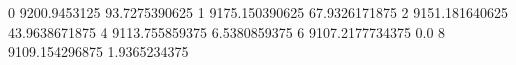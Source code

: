 0 9200.9453125 93.7275390625
1 9175.150390625 67.9326171875
2 9151.181640625 43.9638671875
4 9113.755859375 6.5380859375
6 9107.2177734375 0.0
8 9109.154296875 1.9365234375
